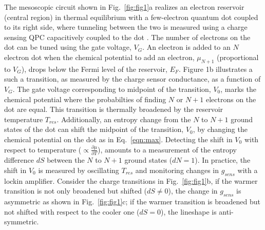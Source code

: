 \documentclass[twocolumn,showpacs,preprintnumbers,amsmath,amssymb,pra,aps,superscriptaddress]{revtex4-1}
\begin{document}
The mesoscopic circuit shown in Fig.~\ref{fig:fig1}a realizes an electron reservoir (central region) in thermal equilibrium with a few-electron quantum dot coupled to its right side, where tunneling between the two is measured using a charge sensing QPC capacitively coupled to the dot \cite{Staring2007, Frolov2009, Thierschmann2015}. The number of electrons on the dot can be tuned using the gate voltage, $V_G$. An electron is added to an $N$ electron dot when the chemical potential to add an electron, $\mu_{N+1}$ (proportional to $V_G$), drops below the Fermi level of the reservoir, $E_F$.  Figure 1b illustrates a such a transition, as measured by the charge sensor conductance, as a function of $V_G$. The gate voltage corresponding to midpoint of the transition, $V_0$, marks the chemical potential where the probabilties of finding $N$ or $N+1$ electrons on the dot are equal. This transition is thermally broadened by the reservoir temperature $T_{res}$. Additionally, an entropy change from the $N$ to $N+1$ ground states of the dot can shift the midpoint of the transition, $V_0$, by changing the chemical potential on the dot as in Eq.~\ref{eqn:max}.  Detecting the shift in $V_0$ with respect to temperature (${\propto}\frac{\partial \mu}{\partial T}$), amounts to a measurement of the entropy difference $dS$ between the $N$ to $N+1$ ground states ($dN=1$).  In practice, the shift in $V_0$ is measured by oscillating $T_{res}$ and monitoring changes in $g_{sens}$ with a lockin amplifier.  Consider the charge transitions in Fig.~\ref{fig:fig1}b, if the warmer transition is not only broadened but shifted ($dS\neq0$), the change in $g_{sens}$ is asymmetric as shown in Fig.~\ref{fig:fig1}c; if the warmer transition is broadened but not shifted with respect to the cooler one ($dS=0$), the lineshape is anti-symmetric.
\end{document}
